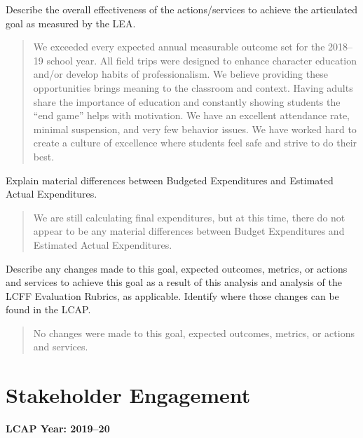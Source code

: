 \documentclass{article}
\newcounter{goal}[section] %
\newcounter{action}[goal]
\begin{document}
Describe the overall effectiveness of the actions/services to achieve the articulated goal as measured by the LEA.
\begin{quotation}
	We exceeded every expected annual measurable outcome set for the 2018--19 school year. All field trips were designed to enhance character education and/or develop habits of professionalism. We believe providing these opportunities brings meaning to the classroom and context. Having adults share the importance of education and constantly showing students the ``end game'' helps with motivation. We have an excellent attendance rate, minimal suspension, and very few behavior issues. We have worked hard to create a culture of excellence where students feel safe and strive to do their best.
\end{quotation}

Explain material differences between Budgeted Expenditures and Estimated Actual Expenditures.
\begin{quotation}
	We are still calculating final expenditures, but at this time, there do not appear to be any material differences between Budget Expenditures and Estimated Actual Expenditures.
\end{quotation}

Describe any changes made to this goal, expected outcomes, metrics, or actions and services to achieve this goal as a result of this analysis and analysis of the LCFF Evaluation Rubrics, as applicable. Identify where those changes can be found in the LCAP.
\begin{quotation}
	No changes were made to this goal, expected outcomes, metrics, or actions and services.
\end{quotation}

\section{Stakeholder Engagement}
{\bf LCAP Year: 2019--20}
\end{document}
